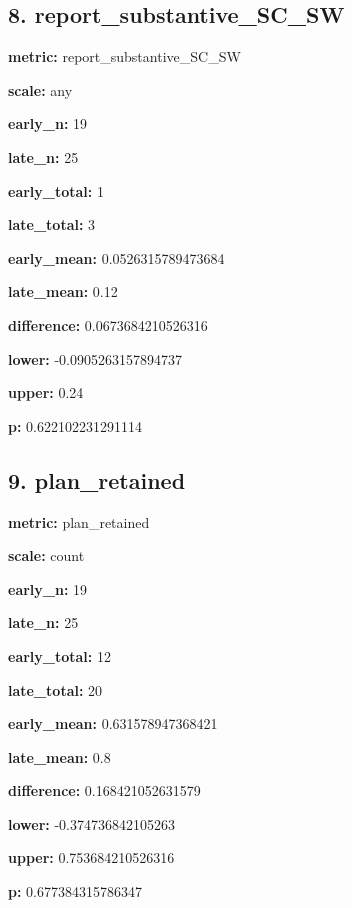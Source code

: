 \documentclass[10pt,a4paper]{article}
\begin{document}
\subsection*{8.\allowbreak{} report\_\allowbreak{}substantive\_\allowbreak{}SC\_\allowbreak{}SW}
\textbf{metric:} report\_\allowbreak{}substantive\_\allowbreak{}SC\_\allowbreak{}SW\par
\textbf{scale:} any\par
\textbf{early\_\allowbreak{}n:} 19\par
\textbf{late\_\allowbreak{}n:} 25\par
\textbf{early\_\allowbreak{}total:} 1\par
\textbf{late\_\allowbreak{}total:} 3\par
\textbf{early\_\allowbreak{}mean:} 0.\allowbreak{}0526315789473684\par
\textbf{late\_\allowbreak{}mean:} 0.\allowbreak{}12\par
\textbf{difference:} 0.\allowbreak{}0673684210526316\par
\textbf{lower:} -\allowbreak{}0.\allowbreak{}0905263157894737\par
\textbf{upper:} 0.\allowbreak{}24\par
\textbf{p:} 0.\allowbreak{}622102231291114\par
\subsection*{9.\allowbreak{} plan\_\allowbreak{}retained}
\textbf{metric:} plan\_\allowbreak{}retained\par
\textbf{scale:} count\par
\textbf{early\_\allowbreak{}n:} 19\par
\textbf{late\_\allowbreak{}n:} 25\par
\textbf{early\_\allowbreak{}total:} 12\par
\textbf{late\_\allowbreak{}total:} 20\par
\textbf{early\_\allowbreak{}mean:} 0.\allowbreak{}631578947368421\par
\textbf{late\_\allowbreak{}mean:} 0.\allowbreak{}8\par
\textbf{difference:} 0.\allowbreak{}168421052631579\par
\textbf{lower:} -\allowbreak{}0.\allowbreak{}374736842105263\par
\textbf{upper:} 0.\allowbreak{}753684210526316\par
\textbf{p:} 0.\allowbreak{}677384315786347\par
\end{document}
